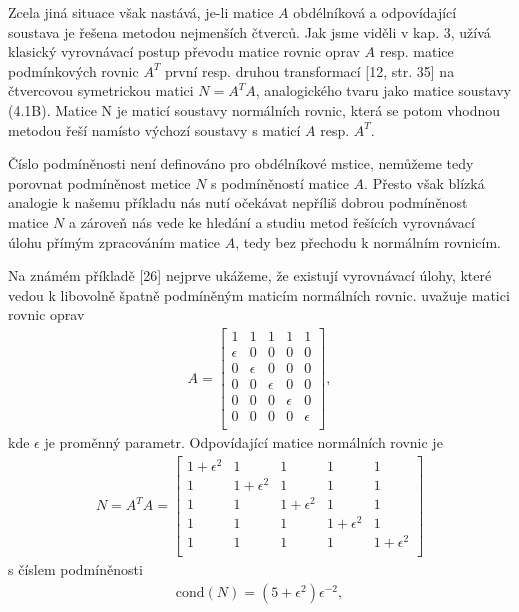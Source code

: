 Zcela jiná situace však nastává, je-li matice $A$ obdélníková a
odpovídající soustava je řešena metodou nejmenších čtverců.  Jak jsme
viděli v kap. 3, užívá klasický vyrovnávací postup převodu matice
rovnic oprav $A$ resp. matice podmínkových rovnic $A^T$ první
resp. druhou  transformací [12, str. 35] na čtvercovou
symetrickou matici $N= A^TA$, analogického tvaru jako
%
matice soustavy (4.1B).  Matice N je maticí soustavy
normálních rovnic, která se potom vhodnou metodou řeší namísto výchozí
soustavy s maticí $A$ resp. $A^T$.


Číslo podmíněnosti není definováno pro obdélníkové mstice,
nemůžeme tedy porovnat podmíněnost metice $N$ s podmíněností
matice $A$. Přesto však blízká analogie k našemu příkladu nás nutí
očekávat nepříliš dobrou podmíněnost matice $N$ a zároveň nás
vede ke hledání a studiu metod řešících vyrovnávací úlohu přímým
zpracováním matice $A$, tedy bez přechodu k normálním rovnicím.



Na známém příkladě  [26] nejprve ukážeme, že
existují vyrovnávací úlohy, které vedou k libovolně špatně
podmíněným maticím normálních rovnic.  uvažuje matici rovnic
oprav
%
\begin{align*}
\tag{4.12}   A =
\begin{bmatrix}
1 & 1 & 1 & 1 & 1 \\
\epsilon & 0 & 0 & 0 & 0 \\
0 & \epsilon & 0 & 0 & 0 \\
0 & 0 & \epsilon & 0 & 0 \\
0 & 0 & 0 & \epsilon & 0 \\
0 & 0 & 0 & 0 & \epsilon \\
\end{bmatrix},
\end{align*}
%
kde $\epsilon$ je proměnný parametr. Odpovídající matice normálních
rovnic je
\begin{align*}
\tag{4.13} N = A^TA =
\begin{bmatrix}
1+\epsilon^2 & 1 & 1 & 1 & 1 \\
1 & 1+\epsilon^2 & 1 & 1 & 1 \\
1 & 1 & 1+\epsilon^2 & 1 & 1 \\
1 & 1 & 1 & 1+\epsilon^2 & 1 \\
1 & 1 & 1 & 1 & 1+\epsilon^2 \\
\end{bmatrix}
\end{align*}
%
s číslem podmíněnosti
%
\begin{align*}
\tag{4.14} \mathrm{cond}(N) = (5 + \epsilon^2)\epsilon^{-2},
\end{align*}
%



